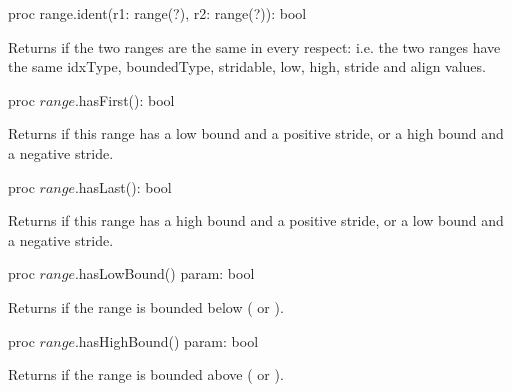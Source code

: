 \begin{protohead}
proc range.ident(r1: range(?), r2: range(?)): bool
\end{protohead}
\begin{protobody}
Returns  if the two ranges are the same in every respect: i.e. the
two ranges have the same idxType,
boundedType, stridable, low, high, stride and
align values.
\end{protobody}

\begin{protohead}
proc $range$.hasFirst(): bool
\end{protohead}
\begin{protobody}
Returns  if this range has a low bound and a positive stride, or a high
bound and a negative stride.
\end{protobody}

\begin{protohead}
proc $range$.hasLast(): bool
\end{protohead}
\begin{protobody}
Returns  if this range has a high bound and a positive stride, or a low
bound and a negative stride.
\end{protobody}

\begin{protohead}
proc $range$.hasLowBound() param: bool
\end{protohead}
\begin{protobody}
Returns  if the range is bounded below ( or ).
\end{protobody}

\begin{protohead}
proc $range$.hasHighBound() param: bool
\end{protohead}
\begin{protobody}
Returns  if the range is bounded above ( or ).
\end{protobody}


